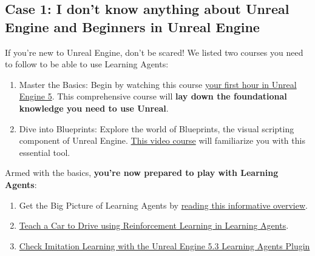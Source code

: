 \documentclass[11pt,a4paper]{article}
\begin{document}

\subsection{Case 1: I don't know anything about Unreal Engine and Beginners in Unreal Engine}\label{case-1-i-dont-know-anything-about-unreal-engine-and-beginners-in-unreal-engine}

If you're new to Unreal Engine, don't be scared! We listed two courses you need to follow to be able to use Learning Agents:

\begin{enumerate}
\def\labelenumi{\arabic{enumi}.}
\item
  Master the Basics: Begin by watching this course \href{https://dev.epicgames.com/community/learning/courses/ZpX/your-first-hour-in-unreal-engine-5/E7L/introduction-to-your-first-hour-in-unreal-engine-5}{your first hour in Unreal Engine 5}. This comprehensive course will \textbf{lay down the foundational knowledge you need to use Unreal}.
\item
  Dive into Blueprints: Explore the world of Blueprints, the visual scripting component of Unreal Engine. \href{https://youtu.be/W0brCeJNMqk?si=zy4t4t1l6FMIzbpz}{This video course} will familiarize you with this essential tool.
\end{enumerate}

Armed with the basics, \textbf{you're now prepared to play with Learning Agents}:

\begin{enumerate}
\def\labelenumi{\arabic{enumi}.}
\setcounter{enumi}{2}
\item
  Get the Big Picture of Learning Agents by \href{https://dev.epicgames.com/community/learning/tutorials/8OWY/unreal-engine-learning-agents-introduction}{reading this informative overview}.
\item
  \href{https://dev.epicgames.com/community/learning/tutorials/qj2O/unreal-engine-learning-to-drive}{Teach a Car to Drive using Reinforcement Learning in Learning Agents}.
\item
  \href{https://www.youtube.com/watch?v=NwYUNlFvajQ}{Check Imitation Learning with the Unreal Engine 5.3 Learning Agents Plugin}
\end{enumerate}
\end{document}
